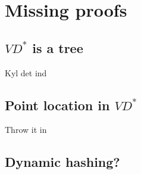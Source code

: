 \section{Missing proofs}
\subsection{$VD^*$ is a tree}
Kyl det ind

\subsection{Point location in $VD^*$}
Throw it in

\subsection{Dynamic hashing?}
